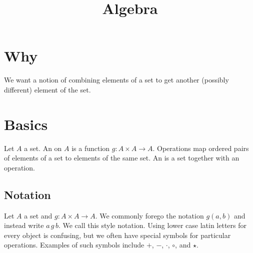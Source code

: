 






\title{Algebra}

\section{Why}

We want a notion of combining elements of a set to get another (possibly different) element of the set.

\section{Basics}


Let $A$ a set.
An  on $A$ is a function $g: A \times A \to A$.
Operations map ordered pairs of elements of a set to elements of the same set.
An  is a set together with an operation.


\subsection{Notation}

Let $A$ a set and $g: A \times A \to A$.
We commonly forego the notation $g(a, b)$ and instead write $a\,g\,b$.
We call this style  notation.
Using lower case latin letters for every object is confusing, but we often have special symbols for particular operations.
Examples of such symbols include $+$, $-$, $\cdot$, $\circ$, and $\star$.


